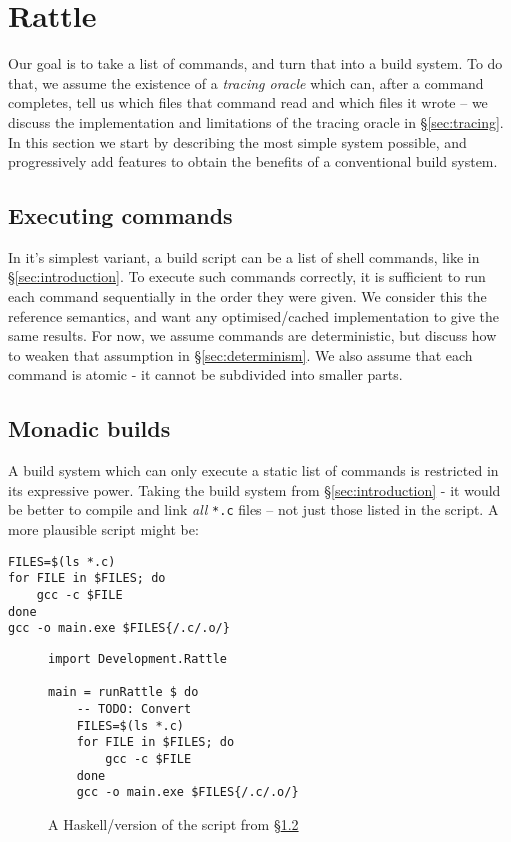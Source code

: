 \section{Rattle}
\label{sec:rattle}

Our goal is to take a list of commands, and turn that into a build system. To do that, we assume the existence of a \emph{tracing oracle} which can, after a command completes, tell us which files that command read and which files it wrote -- we discuss the implementation and limitations of the tracing oracle in \S\ref{sec:tracing}. In this section we start by describing the most simple system possible, and progressively add features to obtain the benefits of a conventional build system.

\subsection{Executing commands}

In it's simplest variant, a build script can be a list of shell commands, like in \S\ref{sec:introduction}. To execute such commands correctly, it is sufficient to run each command sequentially in the order they were given. We consider this the reference semantics, and want any optimised/cached implementation to give the same results. For now, we assume commands are deterministic, but discuss how to weaken that assumption in \S\ref{sec:determinism}. We also assume that each command is atomic - it cannot be subdivided into smaller parts.

\subsection{Monadic builds}
\label{sec:monadic}

A build system which can only execute a static list of commands is restricted in its expressive power. Taking the build system from \S\ref{sec:introduction} - it would be better to compile and link \emph{all} \texttt{*.c} files -- not just those listed in the script. A more plausible script might be:

\begin{verbatim}
FILES=$(ls *.c)
for FILE in $FILES; do
    gcc -c $FILE
done
gcc -o main.exe $FILES{/.c/.o/}
\end{verbatim}

\begin{figure}
\begin{verbatim}
import Development.Rattle

main = runRattle $ do
    -- TODO: Convert
    FILES=$(ls *.c)
    for FILE in $FILES; do
        gcc -c $FILE
    done
    gcc -o main.exe $FILES{/.c/.o/}
\end{verbatim}
\caption{A Haskell/\Rattle version of the script from \S\ref{sec:monadic}}
\label{fig:monadic}
\end{figure}

